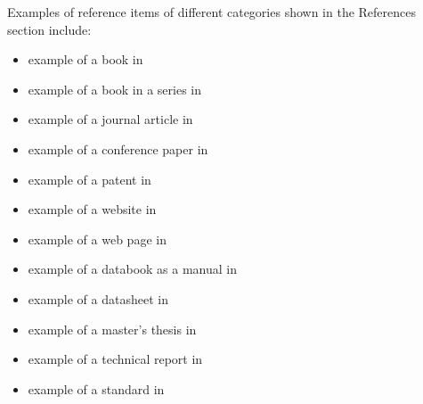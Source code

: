 Examples of reference items of different categories shown in the
References section include:

\begin{itemize}
\item	example of a book in \cite{IEEEexample:book}
\item	example of a book in a series in \cite{IEEEexample:bookwithseriesvolume}
\item	example of a journal article in \cite{IEEEexample:article_typical}
\item	example of a conference paper in \cite{IEEEexample:confwithpaper}
\item	example of a patent in \cite{IEEEexample:uspat}
\item	example of a website in \cite{IEEEexample:IEEEwebsite}
\item	example of a web page in \cite{IEEEexample:shellCTANpage}
\item	example of a databook as a manual in \cite{IEEEexample:motmanual}
\item	example of a datasheet in \cite{IEEEexample:datasheet}
\item	example of a master's thesis in \cite{IEEEexample:masterstype}
\item	example of a technical report in \cite{IEEEexample:techreptype}
\item	example of a standard in \cite{IEEEexample:standard}
\end{itemize}

\enlargethispage{-62mm}
